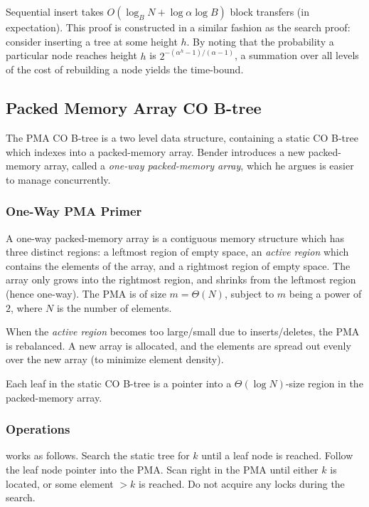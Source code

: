 \documentclass[preprint]{style}
\begin{document}
Sequential insert takes $O(\log_B{N} + \log{\alpha}{\log{B}})$ block
transfers (in expectation). This proof is constructed in a similar fashion as
the search proof: consider inserting a tree at some height $h$. By noting that
the probability a particular node reaches height $h$ is
$2^{-(\alpha^h-1)/(\alpha-1)}$, a summation over all levels of the cost of
rebuilding a node yields the time-bound.



\subsection{Packed Memory Array CO B-tree}
\label{sec:pma}

The PMA CO B-tree is a two level data structure, containing a static CO B-tree
which indexes into a packed-memory array. Bender introduces a new
packed-memory array, called a \textit{one-way packed-memory array}, which he
argues is easier to manage concurrently.

\subsubsection{One-Way PMA Primer}

A one-way packed-memory array is a contiguous memory structure which has three
distinct regions: a leftmost region of empty space, an \textit{active region}
which contains the elements of the array, and a rightmost region of empty
space. The array only grows into the rightmost region, and shrinks from the
leftmost region (hence one-way). The PMA is of size $m = \Theta(N)$, subject
to $m$ being a power of $2$, where $N$ is the number of elements.

When the \textit{active region} becomes too large/small due to
inserts/deletes, the PMA is rebalanced. A new array is allocated, and the
elements are spread out evenly over the new array (to minimize element
density).

Each leaf in the static CO B-tree is a pointer into a $\Theta(\log N)$-size
region in the packed-memory array.


\subsubsection{Operations}

\Search{} works as follows. Search the static tree for $k$ until a leaf node
is reached. Follow the leaf node pointer into the PMA. Scan right in the PMA
until either $k$ is located, or some element $> k$ is reached. Do not acquire
any locks during the search.
\end{document}
